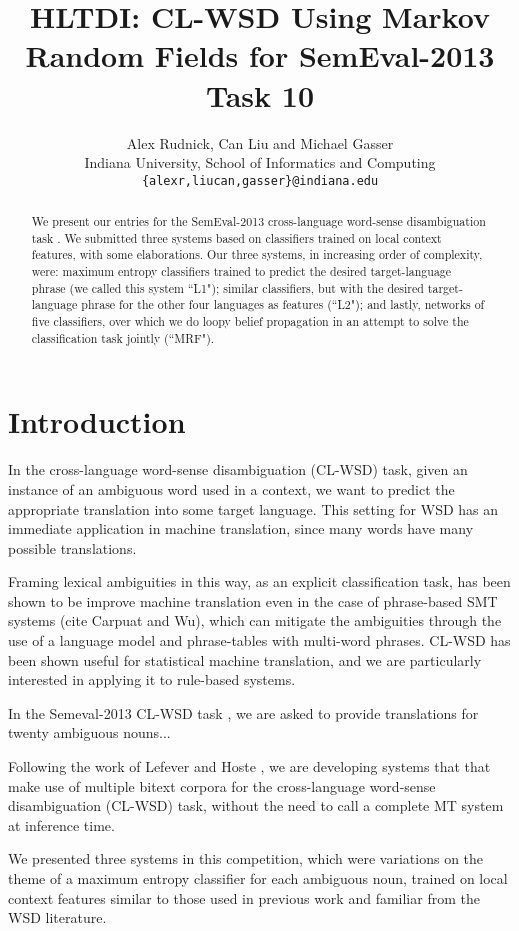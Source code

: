 \documentclass[11pt,letterpaper]{article}
\title{HLTDI: CL-WSD Using Markov Random Fields for SemEval-2013 Task 10}
\author{Alex Rudnick, Can Liu and Michael Gasser\\
	    Indiana University, School of Informatics and Computing \\
	    {\tt \{alexr,liucan,gasser\}@indiana.edu}}
\date{}
\begin{document}
\maketitle

\begin{abstract}
We present our entries for the SemEval-2013 cross-language word-sense
disambiguation task \cite{task10}. We submitted three systems based
on classifiers trained on local context features, with some elaborations.
Our three systems, in increasing order of complexity, were: maximum entropy
classifiers trained to predict the desired target-language phrase (we called
this system ``L1"); similar classifiers, but with the desired target-language
phrase for the other four languages as features (``L2"); and lastly, networks
of five classifiers, over which we do loopy belief propagation in an attempt to
solve the classification task jointly (``MRF").
\end{abstract}

\section{Introduction}
In the cross-language word-sense disambiguation (CL-WSD) task, given an
instance of an ambiguous word used in a context, we want to predict the
appropriate translation into some target language. This setting for WSD has an
immediate application in machine translation, since many words have many
possible translations.

Framing lexical ambiguities in this way, as an explicit classification task,
has been shown to be improve machine translation even in the case of
phrase-based SMT systems (cite Carpuat and Wu), which can mitigate the
ambiguities through the use of a language model and phrase-tables with
multi-word phrases.
CL-WSD has been shown useful for statistical machine translation, and we are
particularly interested in applying it to rule-based systems.

In the Semeval-2013 CL-WSD task \cite{task10}, we are asked to provide
translations for twenty ambiguous nouns...

Following the work of Lefever and Hoste
, we are developing systems
that that make use of multiple bitext corpora for the cross-language word-sense
disambiguation (CL-WSD) task, without the need to call a complete MT system at
inference time.

We presented three systems in this competition, which were variations on the
theme of a maximum entropy classifier for each ambiguous noun, trained on local
context features similar to those used in previous work and familiar from the
WSD literature.
\end{document}
